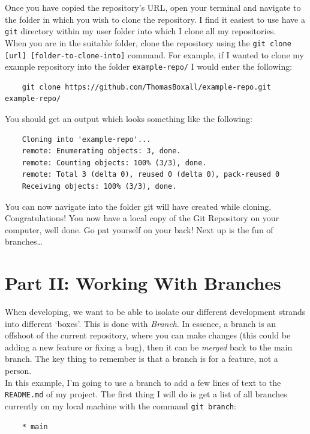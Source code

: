 \documentclass[a4paper, 11pt]{article}
\begin{document}
Once you have copied the repository's URL, open your terminal and navigate to the folder in which you wish to clone the repository. I find it easiest to use have a \verb|git| directory within my user folder into which I clone all my repositories.\\

When you are in the suitable folder, clone the repository using the \verb|git clone [url] [folder-to-clone-into]| command. For example, if I wanted to clone my example repository into the folder \verb|example-repo/| I would enter the following:
\begin{verbatim}
    git clone https://github.com/ThomasBoxall/example-repo.git example-repo/
\end{verbatim}

You should get an output which looks something like the following:
\begin{verbatim}
    Cloning into 'example-repo'...
    remote: Enumerating objects: 3, done.
    remote: Counting objects: 100% (3/3), done.
    remote: Total 3 (delta 0), reused 0 (delta 0), pack-reused 0
    Receiving objects: 100% (3/3), done.
\end{verbatim}

You can now navigate into the folder git will have created while cloning.\\

Congratulations! You now have a local copy of the Git Repository on your computer, well done. Go pat yourself on your back! Next up is the fun of branches\dots

\section{Part II: Working With Branches}
When developing, we want to be able to isolate our different development strands into different `boxes'. This is done with \textit{Branch}. In essence, a branch is an offshoot of the current repository, where you can make changes (this could be adding a new feature or fixing a bug), then it can be \textit{merged} back to the main branch. The key thing to remember is that a branch is for a feature, not a person.\\

In this example, I'm going to use a branch to add a few lines of text to the \verb|README.md| of my project. The first thing I will do is get a list of all branches currently on my local machine with the command \verb|git branch|:
\begin{verbatim}
    * main
\end{verbatim}
\end{document}
